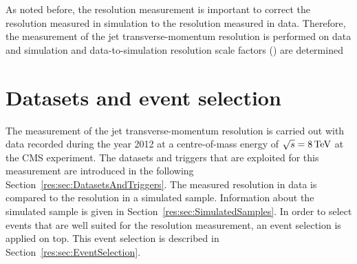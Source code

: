 As noted before, the resolution measurement is important to correct the resolution measured in simulation to the resolution measured in data.
Therefore, the measurement of the jet transverse-momentum resolution is performed on data and simulation and data-to-simulation resolution scale factors (\rhores) are determined
\FloatBarrier
\chapter{Datasets and event selection}

The measurement of the jet transverse-momentum resolution is carried out with \GAMJET data recorded during the year 2012 at a centre-of-mass energy of $\sqrt{s}=8\,\text{Te}\kern-0.06667em\text{V}$ at the CMS experiment.
The datasets and triggers that are exploited for this measurement are introduced in the following Section~\ref{res:sec:DatasetsAndTriggers}.
The measured resolution in data is compared to the resolution in a simulated \GAMJET sample. %
Information about the simulated sample is given in Section~\ref{res:sec:SimulatedSamples}.
In order to select \GAMJET events that are well suited for the resolution measurement, an event selection is applied on top.
This event selection is described in Section~\ref{res:sec:EventSelection}.

